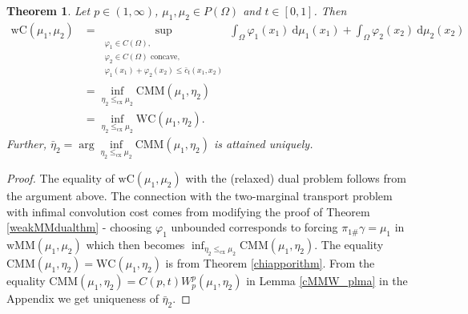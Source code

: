 \documentclass[10pt,a4paper]{amsart}
\newcommand{\dd}{\mathrm{d}}
\newtheorem{thm}{Theorem}[section]
\begin{document}
\begin{thm}\label{weakdualityN2thm}
	Let $p\in(1,\infty)$, $\mu_1,\mu_2\in P(\Omega)$ and $t\in[0,1]$. Then
	\begin{align*}
		\text{wC}(\mu_1,\mu_2)&=\sup_{\substack{\varphi_1\in C(\Omega),\\ \varphi_2\in C(\Omega)\text{ concave},\\
				\varphi_1(x_1)+\varphi_2(x_2)\leq\bar c_t(x_1,x_2)}}\int_\Omega\varphi_1(x_1)\ \dd\mu_1(x_1)+\int_\Omega\varphi_2(x_2)\ \dd\mu_2(x_2)\\
		&=\inf_{\eta_2\leq_{\text{cx}}\mu_2}\text{CMM}(\mu_1,\eta_2)\\
		&=\inf_{\eta_2\leq_{\text{cx}}\mu_2}\text{WC}(\mu_1,\eta_2).
	\end{align*}
	Further, $\bar\eta_2=\arg\inf\limits_{\eta_2\leq_{\text{cx}}\mu_2}\text{CMM}(\mu_1,\eta_2)$ is attained uniquely.
\end{thm}

\begin{proof}
	The equality of $\text{wC}(\mu_1,\mu_2)$ with the (relaxed) dual problem follows from the argument above. The connection with the two-marginal transport problem with infimal convolution cost comes from modifying the proof of Theorem \ref{weakMMdualthm} - choosing $\varphi_1$ unbounded corresponds to forcing $\pi_{1\#}\gamma=\mu_1$ in $\text{wMM}(\mu_1,\mu_2)$ which then becomes $\inf_{\eta_2\leq_{\text{cx}}\mu_2}\text{CMM}(\mu_1,\eta_2)$. The equality $\text{CMM}(\mu_1,\eta_2)=\text{WC}(\mu_1,\eta_2)$ is from Theorem \ref{chiapporithm}. From the equality $\text{CMM}(\mu_1,\eta_2)=C(p,t)W_p^p(\mu_1,\eta_2)$ in Lemma \ref{cMMW_plma} in the Appendix we get uniqueness of $\bar\eta_2$.
\end{proof}
\end{document}
